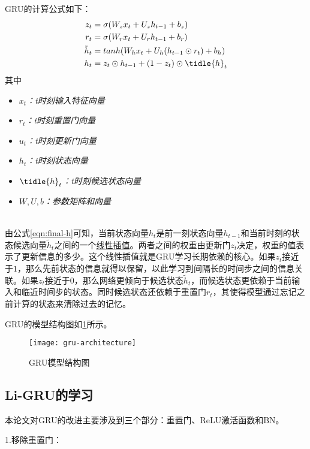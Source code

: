 GRU的计算公式如下：
\begin{align}
z_t &= \sigma(W_{z}x_{t}+U_{z}h_{t-1}+b_z) \label{eqn:up-gate} \\
r_t &= \sigma(W_{r}x_{t}+U_{r}h_{t-1}+b_r) \label{eqn:re-gate} \\
\tilde{h}_{t} &= tanh(W_{h}x_{t}+U_{h}(h_{t-1}\odot{r_{t}})+b_{h}) \label{eqn:candi-h} \\
h_{t} &= z_{t}\odot{h_{t-1}} + (1-z_{t})\odot\tidle{h}_{t}  \label{eqn:final-h}
\end{align}
其中
\begin{itemize}
  \item \textit{$x_t$：t时刻输入特征向量} 
  \item \textit{$r_t$：t时刻重置门向量}  
  \item \textit{$u_t$：t时刻更新门向量}
  \item \textit{$h_t$：t时刻状态向量}
  \item \textit{$\tidle{h}_t$：t时刻候选状态向量}
  \item \textit{$W,U,b$：参数矩阵和向量}

\end{itemize}\\


由公式\ref{eqn:final-h}可知，当前状态向量$h_t$是前一刻状态向量$h_{t-1}$和当前时刻的状态候选向量$\tilde{h}_{t}$之间的一个\href{https://zh.wikipedia.org/zh-hans/\%E7\%BA\%BF\%E6\%80\%A7\%E6\%8F\%92\%E5\%80\%BC}{线性插值}。两者之间的权重由更新门$z_{t}$决定，权重的值表示了更新信息的多少。这个线性插值就是GRU学习长期依赖的核心。如果$z_{t}$接近于$1$，那么先前状态的信息就得以保留，以此学习到间隔长的时间步之间的信息关联。如果$z_t$接近于$0$，那么网络更倾向于候选状态$\tilde{h}_{t}$，而候选状态更依赖于当前输入和临近时间步的状态。同时候选状态还依赖于重置门$r_{t}$，其使得模型通过忘记之前计算的状态来清除过去的记忆。

GRU的模型结构图如\ref{fig:gru}所示。
\begin{figure}[htbp]
  \centering
  \texttt{[image: gru-architecture]}
  \caption{GRU模型结构图 \label{fig:gru}}
\end{figure}

\subsection{Li-GRU的学习}
\label{sec:li-gru}
本论文对GRU的改进主要涉及到三个部分：重置门、ReLU激活函数和BN。

1.移除重置门：

